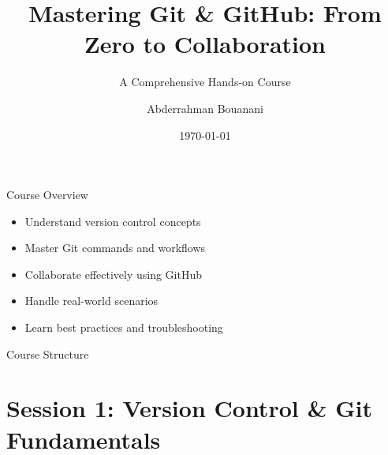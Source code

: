 \documentclass[aspectratio=169]{beamer}
\title[Git \& GitHub]{\textbf{Mastering Git \& GitHub: From Zero to Collaboration}}
\subtitle{A Comprehensive Hands-on Course}
\author{Abderrahman Bouanani}
\institute{ENSAA}
\date{\today}
\begin{document}
\begin{frame}
  \titlepage
\end{frame}

\begin{frame}{Course Overview}
  \begin{itemize}
    \item Understand version control concepts
    \item Master Git commands and workflows
    \item Collaborate effectively using GitHub
    \item Handle real-world scenarios
    \item Learn best practices and troubleshooting
  \end{itemize}
\end{frame}

\begin{frame}{Course Structure}
  \tableofcontents
\end{frame}

\section{Session 1: Version Control \& Git Fundamentals}
\end{document}
